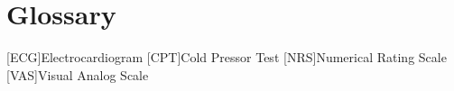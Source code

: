 \chapter{Glossary}

\footnotesize
\SingleSpacing

\begin{multicols}{2}
\begin{acronym}[AAAAAA]

	[ECG]{Electrocardiogram}
	[CPT]{Cold Pressor Test}
	[NRS]{Numerical Rating Scale}
	[VAS]{Visual Analog Scale}

\end{acronym}
\end{multicols}


